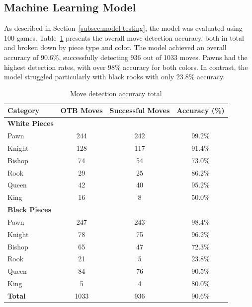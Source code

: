 \subsection{Machine Learning Model}
\label{machine-learning-test}

As described in Section~\ref{subsec:model-testing}, the model was evaluated using 100 games. Table~\ref{tab:accuracy-total} presents the overall move detection accuracy, both in total and broken down by piece type and color. The model achieved an overall accuracy of 90.6\%, successfully detecting 936 out of 1033 moves. Pawns had the highest detection rates, with over 98\% accuracy for both colors. In contrast, the model struggled particularly with black rooks with only 23.8\% accuracy.

\begin{table}[htbp]
\centering
\caption{Move detection accuracy total}
\label{tab:accuracy-total}
\begin{tabular}{lccc}
\toprule
\textbf{Category} & \textbf{OTB Moves} & \textbf{Successful Moves} & \textbf{Accuracy (\%)} \\
\midrule
\textbf{White Pieces} & & & \\
\hspace{1em}Pawn  & 244 & 242 & 99.2\% \\
\hspace{1em}Knight & 128 & 117 & 91.4\% \\
\hspace{1em}Bishop & 74  & 54  & 73.0\% \\
\hspace{1em}Rook   & 29  & 25  & 86.2\% \\
\hspace{1em}Queen  & 42  & 40  & 95.2\% \\
\hspace{1em}King   & 16  & 8   & 50.0\% \\
\midrule
\textbf{Black Pieces} & & & \\
\hspace{1em}Pawn  & 247 & 243 & 98.4\% \\
\hspace{1em}Knight & 78  & 75  & 96.2\% \\
\hspace{1em}Bishop & 65  & 47  & 72.3\% \\
\hspace{1em}Rook   & 21  & 5   & 23.8\% \\
\hspace{1em}Queen  & 84  & 76  & 90.5\% \\
\hspace{1em}King   & 5   & 4   & 80.0\% \\
\midrule
\textbf{Total} & 1033 & 936 & 90.6\% \\
\bottomrule
\end{tabular}
\end{table}


